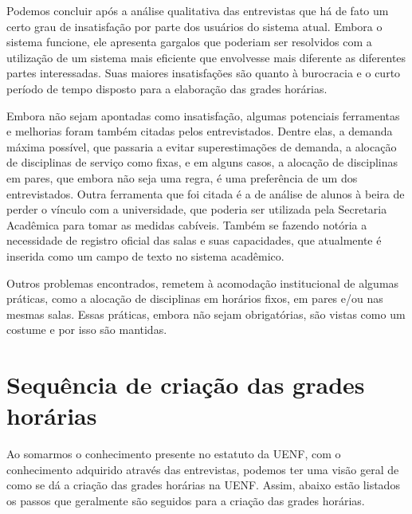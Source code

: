 Podemos concluir após a análise qualitativa das entrevistas que há de fato um certo grau de insatisfação por parte dos usuários do sistema atual. Embora o sistema funcione, ele apresenta gargalos que poderiam ser resolvidos com a utilização de um sistema mais eficiente que envolvesse mais diferente as diferentes partes interessadas. Suas maiores insatisfações são quanto à burocracia e o curto período de tempo disposto para a elaboração das grades horárias.

Embora não sejam apontadas como insatisfação, algumas potenciais ferramentas e melhorias foram também citadas pelos entrevistados. Dentre elas, a demanda máxima possível, que passaria a evitar superestimações de demanda, a alocação de disciplinas de serviço como fixas, e em alguns casos, a alocação de disciplinas em pares, que embora não seja uma regra, é uma preferência de um dos entrevistados. Outra ferramenta que foi citada é a de análise de alunos à beira de perder o vínculo com a universidade, que poderia ser utilizada pela Secretaria Acadêmica para tomar as medidas cabíveis. Também se fazendo notória a necessidade de registro oficial das salas e suas capacidades, que atualmente é inserida como um campo de texto no sistema acadêmico.

Outros problemas encontrados, remetem à acomodação institucional de algumas práticas, como a alocação de disciplinas em horários fixos, em pares e/ou nas mesmas salas. Essas práticas, embora não sejam obrigatórias, são vistas como um costume e por isso são mantidas.

\section{Sequência de criação das grades horárias} \label{sec:sequencia} %


Ao somarmos o conhecimento presente no estatuto da UENF, com o conhecimento adquirido através das entrevistas, podemos ter uma visão geral de como se dá a criação das grades horárias na UENF. Assim, abaixo estão listados os passos que geralmente são seguidos para a criação das grades horárias.

